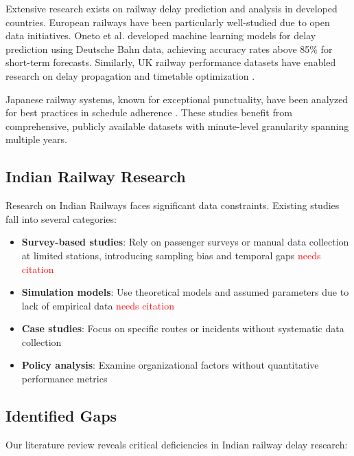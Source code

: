 \documentclass[conference]{IEEEtran}
\begin{document}
Extensive research exists on railway delay prediction and analysis in developed countries. European railways have been particularly well-studied due to open data initiatives. Oneto et al. \cite{oneto2018train} developed machine learning models for delay prediction using Deutsche Bahn data, achieving accuracy rates above 85\% for short-term forecasts. Similarly, UK railway performance datasets have enabled research on delay propagation \cite{flier2009delay} and timetable optimization \cite{goverde2010railway}.

Japanese railway systems, known for exceptional punctuality, have been analyzed for best practices in schedule adherence \cite{tomii2005train}. These studies benefit from comprehensive, publicly available datasets with minute-level granularity spanning multiple years.

\subsection{Indian Railway Research}

Research on Indian Railways faces significant data constraints. Existing studies fall into several categories:

\begin{itemize}
    \item \textbf{Survey-based studies}: Rely on passenger surveys or manual data collection at limited stations, introducing sampling bias and temporal gaps \textcolor{red}{needs citation}
    \item \textbf{Simulation models}: Use theoretical models and assumed parameters due to lack of empirical data \textcolor{red}{needs citation}
    \item \textbf{Case studies}: Focus on specific routes or incidents without systematic data collection
    \item \textbf{Policy analysis}: Examine organizational factors without quantitative performance metrics
\end{itemize}

\subsection{Identified Gaps}

Our literature review reveals critical deficiencies in Indian railway delay research:
\end{document}
